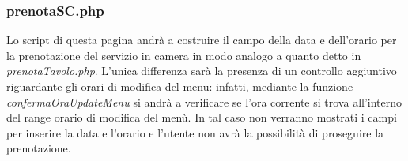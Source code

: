 \documentclass [a4paper, 12pt]{book}
\begin{document}
\subsubsection{prenotaSC.php}
Lo script di questa pagina andrà a costruire il campo della data e dell'orario per la prenotazione del servizio in camera in modo analogo a quanto detto in \textit{prenotaTavolo.php}. L'unica differenza sarà la presenza di un controllo aggiuntivo riguardante gli orari di modifica del menu: infatti, mediante la funzione \textit{confermaOraUpdateMenu} si andrà a verificare se l'ora corrente si trova all'interno del range orario di modifica del menù. In tal caso non verranno mostrati i campi per inserire la data e l'orario e l'utente non avrà la possibilità di proseguire la prenotazione.
\end{document}
